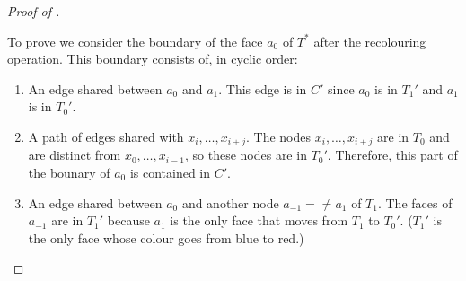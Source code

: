 \documentclass{patmorin}
\begin{document}
\begin{proof}[Proof of ]
\begin{enumerate}
   To prove  we consider the boundary of the face
   $a_0$ of $T^*$ after the recolouring operation.  This boundary
   consists of, in cyclic order:
   \begin{enumerate}
     \item  An edge shared between $a_0$ and $a_1$.  This edge is in
       $C'$ since $a_0$ is in $T_1'$ and $a_1$ is in $T_0'$.

     \item A path of edges shared with $x_i,\ldots,x_{i+j}$.
      The nodes $x_i,\ldots,x_{i+j}$ are in $T_0$ and are distinct from
      $x_0,\ldots,x_{i-1}$, so these nodes are in $T_0'$.
      Therefore, this part of the bounary of $a_0$ is contained in $C'$.

     \item An edge shared between $a_0$ and another node $a_{-1}=\neq
     a_1$ of $T_1$. The faces of $a_{-1}$ are in $T_1'$ because $a_1$
     is the only face that moves from $T_1$ to $T_0'$. ($T_1'$ is the
     only face whose colour goes from blue to red.)


\end{enumerate}
\end{enumerate}
\end{proof}
\end{document}

